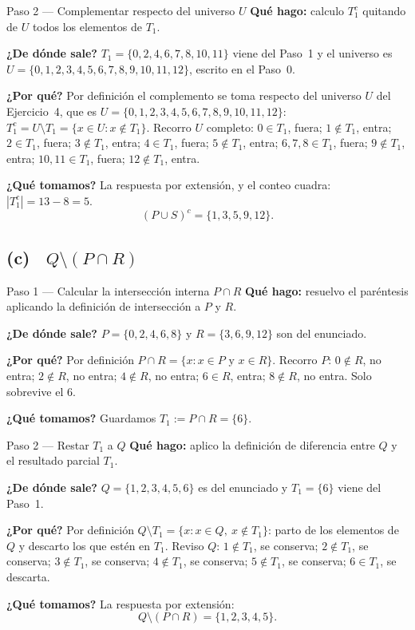 \documentclass[11pt]{article}
\begin{document}
\begin{paso}{Paso 2 --- Complementar respecto del universo $U$}
\textbf{Qué hago:} calculo $T_1^{c}$ quitando de $U$ todos los elementos de $T_1$.

\textbf{¿De dónde sale?} $T_1=\{0,2,4,6,7,8,10,11\}$ viene del Paso~1 y el universo es
$U=\{0,1,2,3,4,5,6,7,8,9,10,11,12\}$, escrito en el Paso~0.

\textbf{¿Por qué?} Por definición el complemento se toma respecto del universo $U$ del
Ejercicio~4, que es $U=\{0,1,2,3,4,5,6,7,8,9,10,11,12\}$: $T_1^{c}=U\setminus T_1=\{x\in U:
x\notin T_1\}$. Recorro $U$ completo: $0\in T_1$, fuera; $1\notin T_1$, entra; $2\in T_1$,
fuera; $3\notin T_1$, entra; $4\in T_1$, fuera; $5\notin T_1$, entra; $6,7,8\in T_1$, fuera;
$9\notin T_1$, entra; $10,11\in T_1$, fuera; $12\notin T_1$, entra.

\textbf{¿Qué tomamos?} La respuesta por extensión, y el conteo cuadra:
$|T_1^{c}|=13-8=5$.
\[
(P\cup S)^{c}=\{1,3,5,9,12\}.
\]
\end{paso}

\subsection*{(c) \ $Q\setminus(P\cap R)$}

\begin{paso}{Paso 1 --- Calcular la intersección interna $P\cap R$}
\textbf{Qué hago:} resuelvo el paréntesis aplicando la definición de intersección a $P$ y $R$.

\textbf{¿De dónde sale?} $P=\{0,2,4,6,8\}$ y $R=\{3,6,9,12\}$ son del enunciado.

\textbf{¿Por qué?} Por definición $P\cap R=\{x: x\in P \text{ y } x\in R\}$. Recorro $P$:
$0\notin R$, no entra; $2\notin R$, no entra; $4\notin R$, no entra; $6\in R$, entra;
$8\notin R$, no entra. Solo sobrevive el $6$.

\textbf{¿Qué tomamos?} Guardamos $T_1:=P\cap R=\{6\}$.
\end{paso}

\begin{paso}{Paso 2 --- Restar $T_1$ a $Q$}
\textbf{Qué hago:} aplico la definición de diferencia entre $Q$ y el resultado parcial $T_1$.

\textbf{¿De dónde sale?} $Q=\{1,2,3,4,5,6\}$ es del enunciado y $T_1=\{6\}$ viene del Paso~1.

\textbf{¿Por qué?} Por definición $Q\setminus T_1=\{x: x\in Q,\ x\notin T_1\}$: parto de los
elementos de $Q$ y descarto los que estén en $T_1$. Reviso $Q$: $1\notin T_1$, se conserva;
$2\notin T_1$, se conserva; $3\notin T_1$, se conserva; $4\notin T_1$, se conserva;
$5\notin T_1$, se conserva; $6\in T_1$, se descarta.

\textbf{¿Qué tomamos?} La respuesta por extensión:
\[
Q\setminus(P\cap R)=\{1,2,3,4,5\}.
\]
\end{paso}
\end{document}
